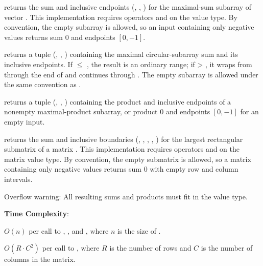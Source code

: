 \begin{compactitem}
  \item {} returns the sum and inclusive endpoints (, , ) for the maximal-sum subarray of vector . This implementation requires operators \inlinecode{+} and \inlinecode{\textless{}} on the value type. By convention, the empty subarray is allowed, so an input containing only negative values returns sum $0$ and endpoints $[0, -1]$.
  \item {} returns a tuple (, , ) containing the maximal circular-subarray sum and its inclusive endpoints. If  $\leq$ , the result is an ordinary range; if  \textgreater{} , it wraps from  through the end of  and continues through . The empty subarray is allowed under the same convention as .
  \item {} returns a tuple (, , ) containing the product and inclusive endpoints of a nonempty maximal-product subarray, or product $0$ and endpoints $[0, -1]$ for an empty input.
  \item {} returns the sum and inclusive boundaries (, , , , ) for the largest rectangular submatrix of a matrix . This implementation requires operators \inlinecode{+} and \inlinecode{\textless{}} on the matrix value type. By convention, the empty submatrix is allowed, so a matrix containing only negative values returns sum $0$ with empty row and column intervals.
\end{compactitem}

Overflow warning: All resulting sums and products must fit in the value type.

\textbf{Time Complexity}:
\begin{compactitem}
  \item $O(n)$ per call to , , and , where $n$ is the size of .
  \item $O(R \cdot C^{2})$ per call to , where $R$ is the number of rows and $C$ is the number of columns in the matrix.
\end{compactitem}

